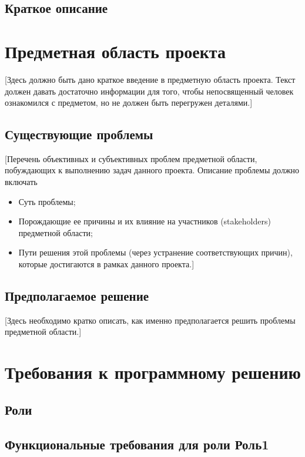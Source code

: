 \documentclass[a4paper]{report}
\newcommand{\Comment}[1]{{\color{blue}#1}}
\begin{document}
		\section{Краткое описание}	
	\chapter{Предметная область проекта}
		\Comment{
			[Здесь должно быть дано краткое введение в предметную область проекта. Текст должен давать достаточно информации для того, чтобы непосвященный человек ознакомился с предметом, но не должен быть перегружен деталями.]
		}
	
		\section{Существующие проблемы}
			\Comment{
				[Перечень объективных и субъективных проблем предметной области, побуждающих к выполнению задач данного проекта. Описание проблемы должно включать
				
				\begin{itemize}
					\item Суть проблемы;
					
					\item Порождающие ее причины и их влияние на участников (stakeholders)  предметной области;
					
					\item Пути решения этой проблемы (через устранение соответствующих причин), которые достигаются в рамках данного проекта.]
				\end{itemize}
			}
		\section{Предполагаемое решение}
			\Comment{
				[Здесь необходимо кратко описать, как именно предполагается решить проблемы предметной области.]
			}
	\chapter{Требования к программному решению}
		\section{Роли}
		
		\section{Функциональные требования для роли Роль1}
\end{document}
